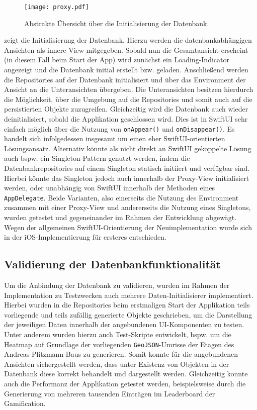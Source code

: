 \begin{figure}[H]
\texttt{[image: proxy.pdf]}
\caption{Abstrakte Übersicht über die Initialisierung der Datenbank.}\label{fig:proxy}
\end{figure}

 zeigt die Initialisierung der Datenbank. Hierzu werden die datenbankabhängigen Ansichten als innere View mitgegeben. Sobald nun die Gesamtansicht erscheint (in diesem Fall beim Start der App) wird zunächst ein Loading-Indicator angezeigt und die Datenbank initial erstellt bzw. geladen.  Anschließend werden die Repositories auf der Datenbank initialisiert und über das Environment der Ansicht an die Unteransichten übergeben. Die Unteransichten besitzen hierdurch die Möglichkeit, über die Umgebung auf die Repositories und somit auch auf die persistierten Objekte zuzugreifen. Gleichzeitig wird die Datenbank auch wieder deinitialisiert, sobald die Applikation geschlossen wird. Dies ist in SwiftUI sehr einfach möglich über die Nutzung von \texttt{onAppear()} und \texttt{onDisappear()}. Es handelt sich infolgedessen insgesamt um einen eher SwiftUI-orientierten Lösungsansatz. Alternativ könnte als nicht direkt an SwiftUI gekoppelte Lösung auch bspw. ein Singleton-Pattern genutzt werden, indem die Datenbankrepositories auf einem Singleton statisch initiiert und verfügbar sind. Hierbei könnte das Singleton jedoch auch innerhalb der Proxy-View initialisiert werden, oder unabhängig von SwiftUI innerhalb der Methoden eines \texttt{AppDelegate}. Beide Varianten, also einerseits die Nutzung des Environment zusammen mit einer Proxy-View und andererseits die Nutzung eines Singletons, wurden getestet und gegeneinander im Rahmen der Entwicklung abgewägt. Wegen der allgemeinen SwiftUI-Orientierung der Neuimplementation wurde sich in der iOS-Implementierung für ersteres entschieden.

\subsection{Validierung der Datenbankfunktionalität}

Um die Anbindung der Datenbank zu validieren, wurden im Rahmen der Implementation zu Testzwecken auch mehrere Daten-Initialisierer implementiert. Hierbei wurden in die Repositories beim erstmaligen Start der Applikation teils vorliegende und teils zufällig generierte Objekte geschrieben, um die Darstellung der jeweiligen Daten innerhalb der angebundenen UI-Komponenten zu testen. Unter anderem wurden hierzu auch Test-Skripte entwickelt, bspw. um die Heatmap auf Grundlage der vorliegenden \texttt{GeoJSON}-Umrisse der Etagen des Andreas-Pfitzmann-Baus zu generieren. Somit konnte für die angebundenen Ansichten sichergestellt werden, dass unter Existenz von Objekten in der Datenbank diese korrekt behandelt und dargestellt werden. Gleichzeitig konnte auch die Performanz der Applikation getestet werden, beispielsweise durch die Generierung von mehreren tausenden Einträgen im Leaderboard der Gamification.

